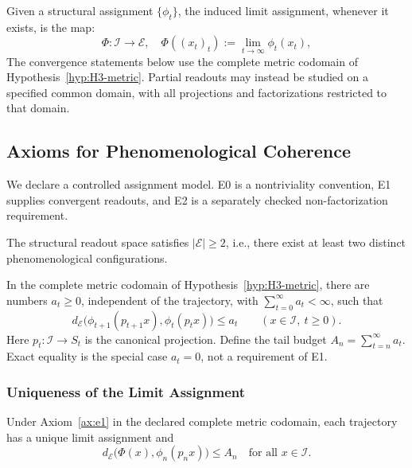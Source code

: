 \begin{definition}\label{def:limitassign}
Given a structural assignment $\{\phi_t\}$, the induced limit assignment, whenever it exists, is the map:
\begin{equation}
    \Phi: \mathcal{I} \to \mathcal{E}, \quad \Phi((x_t)_t) := \lim_{t \to \infty} \phi_t(x_t),
\end{equation}
The convergence statements below use the complete metric codomain of Hypothesis~\ref{hyp:H3-metric}. Partial readouts may instead be studied on a specified common domain, with all projections and factorizations restricted to that domain.
\end{definition}



\subsection{Axioms for Phenomenological Coherence}

We declare a controlled assignment model. E0 is a nontriviality convention, E1 supplies convergent readouts, and E2 is a separately checked non-factorization requirement.

\begin{axiom}\label{ax:e0}
The structural readout space satisfies $|\mathcal{E}| \geq 2$, i.e., there exist at least two distinct phenomenological configurations.
\end{axiom}

\begin{axiom}\label{ax:e1}
In the complete metric codomain of Hypothesis~\ref{hyp:H3-metric}, there are numbers $a_t\geq0$, independent of the trajectory, with $\sum_{t=0}^{\infty}a_t<\infty$, such that
\[
d_{\mathcal E}\bigl(\phi_{t+1}(p_{t+1}x),\phi_t(p_tx)\bigr)\leq a_t
\qquad(x\in\mathcal I,\ t\geq0).
\]
Here $p_t:\mathcal I\to S_t$ is the canonical projection. Define the tail budget $A_n=\sum_{t=n}^{\infty}a_t$. Exact equality is the special case $a_t=0$, not a requirement of E1.
\end{axiom}

\subsubsection{Uniqueness of the Limit Assignment}

\begin{proposition}\label{prop:unique-phi}
Under Axiom~\ref{ax:e1} in the declared complete metric codomain, each trajectory has a unique limit assignment and
\[
d_{\mathcal E}\bigl(\Phi(x),\phi_n(p_nx)\bigr)\leq A_n
\quad\text{for all }x\in\mathcal I.
\]
\end{proposition}

